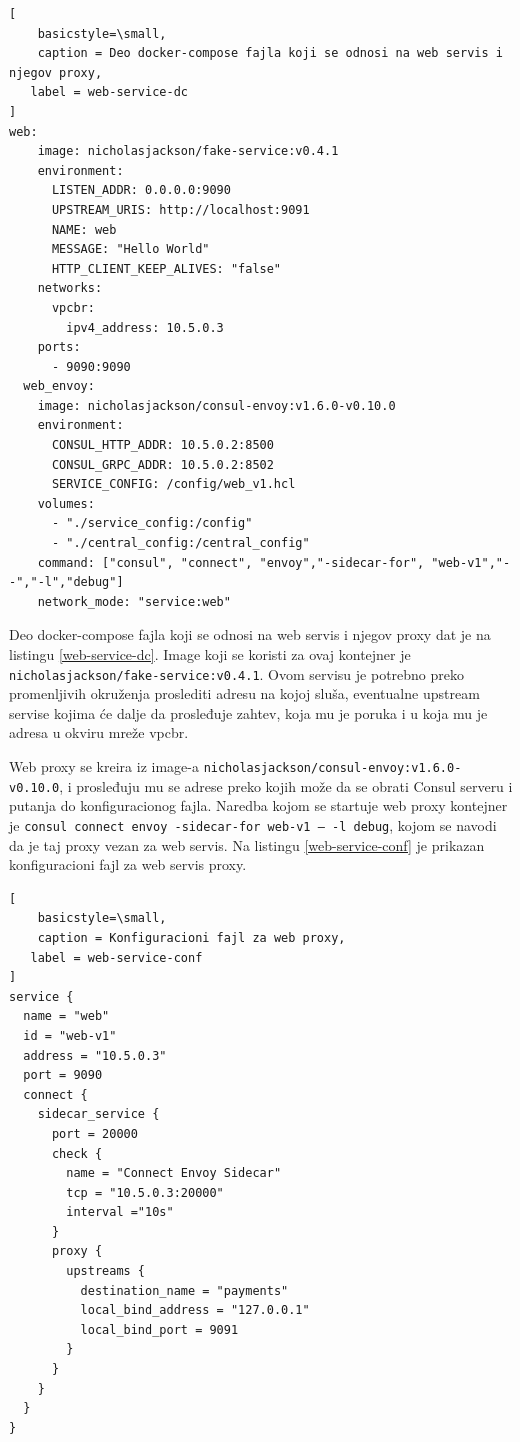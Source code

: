 \documentclass[a4paper,12pt]{report}
\begin{document}
\begin{lstlisting}[
    basicstyle=\small,
    caption = Deo docker-compose fajla koji se odnosi na web servis i njegov proxy, 
   label = web-service-dc
]
web:
    image: nicholasjackson/fake-service:v0.4.1
    environment:
      LISTEN_ADDR: 0.0.0.0:9090
      UPSTREAM_URIS: http://localhost:9091
      NAME: web
      MESSAGE: "Hello World"
      HTTP_CLIENT_KEEP_ALIVES: "false"
    networks:
      vpcbr:
        ipv4_address: 10.5.0.3
    ports:
      - 9090:9090
  web_envoy:
    image: nicholasjackson/consul-envoy:v1.6.0-v0.10.0
    environment:
      CONSUL_HTTP_ADDR: 10.5.0.2:8500
      CONSUL_GRPC_ADDR: 10.5.0.2:8502
      SERVICE_CONFIG: /config/web_v1.hcl
    volumes:
      - "./service_config:/config"
      - "./central_config:/central_config"
    command: ["consul", "connect", "envoy","-sidecar-for", "web-v1","--","-l","debug"]
    network_mode: "service:web"
\end{lstlisting}

Deo docker-compose fajla koji se odnosi na web servis i njegov proxy dat je na listingu \ref{web-service-dc}. Image koji se koristi za ovaj kontejner je \texttt{nicholasjackson/fake-service:v0.4.1}. Ovom servisu je potrebno preko promenljivih okruženja proslediti adresu na kojoj sluša, eventualne upstream servise kojima će dalje da prosleđuje zahtev, koja mu je poruka i u koja mu je adresa u okviru mreže vpcbr. \newline

Web proxy se kreira iz image-a \texttt{nicholasjackson/consul-envoy:v1.6.0-v0.10.0}, i prosleđuju mu se adrese preko kojih može da se obrati Consul serveru i putanja do konfiguracionog fajla. Naredba kojom se startuje web proxy kontejner je \texttt{consul connect envoy -sidecar-for web-v1 -- -l debug}, kojom se navodi da je taj proxy vezan za web servis. Na listingu \ref{web-service-conf} je prikazan konfiguracioni fajl za web servis proxy. \newline

\begin{center}
\begin{lstlisting}[
    basicstyle=\small,
    caption = Konfiguracioni fajl za web proxy, 
   label = web-service-conf
]
service {
  name = "web"
  id = "web-v1"
  address = "10.5.0.3"
  port = 9090
  connect { 
    sidecar_service {
      port = 20000
      check {
        name = "Connect Envoy Sidecar"
        tcp = "10.5.0.3:20000"
        interval ="10s"
      }
      proxy {
        upstreams {
          destination_name = "payments"
          local_bind_address = "127.0.0.1"
          local_bind_port = 9091
        }
      }
    }  
  }
}
\end{lstlisting}
\end{center}
\end{document}
